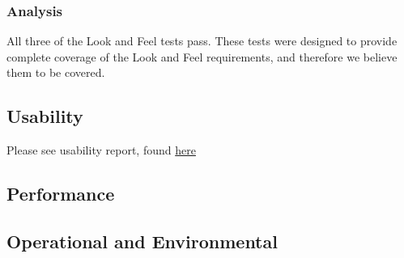 \documentclass[12pt, titlepage]{article}
\begin{document}
    \subsubsection{Analysis}
    All three of the Look and Feel tests pass. These tests were designed to provide complete coverage of the Look and Feel requirements, and therefore we believe them to be covered.
\subsection{Usability}
	Please see usability report, found \href{https://github.com/OKKM-insights/OKKM.insights/blob/main/docs/Extras/UsabilityReport/UsabilityReport.pdf}{here}

\subsection{Performance}
\subsection{Operational and Environmental}
\end{document}
